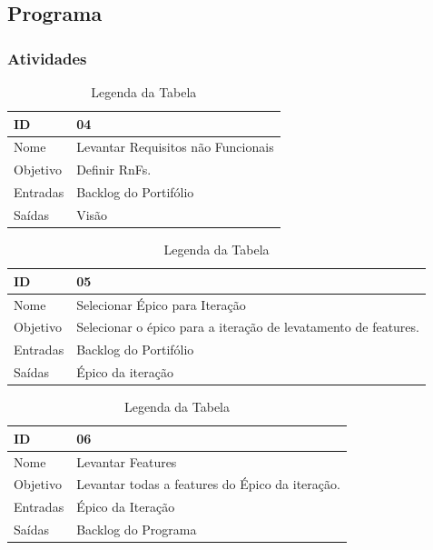   \subsection{Programa}

  \subsubsection{Atividades}

  \begin{table}[H]
    \centering
      \begin{tabular}{| m{5em} | m{10cm} |}
        \hline
        ID       & 04   \\ \hline
        Nome     & Levantar Requisitos não Funcionais   \\ \hline
        Objetivo & Definir RnFs. \\ \hline
        Entradas & Backlog do Portifólio   \\ \hline
        Saídas   & Visão \\ \hline
      \end{tabular}
      \caption{Legenda da Tabela}
      \label{tabela:atividade4}
  \end{table}

  \begin{table}[H]
    \centering
      \begin{tabular}{| m{5em} | m{10cm} |}
        \hline
        ID       & 05   \\ \hline
        Nome     & Selecionar Épico para Iteração   \\ \hline
        Objetivo & Selecionar o épico para a iteração de levatamento de features. \\ \hline
        Entradas & Backlog do Portifólio\\ \hline
        Saídas   & Épico da iteração \\ \hline
      \end{tabular}
      \caption{Legenda da Tabela}
      \label{tabela:atividade5}
  \end{table}

  \begin{table}[H]
    \centering
      \begin{tabular}{| m{5em} | m{10cm} |}
        \hline
        ID       & 06   \\ \hline
        Nome     & Levantar Features   \\ \hline
        Objetivo & Levantar todas a features do Épico da iteração. \\ \hline
        Entradas & Épico da Iteração\\ \hline
        Saídas   & Backlog do Programa \\ \hline
      \end{tabular}
      \caption{Legenda da Tabela}
      \label{tabela:atividade6}
  \end{table}

